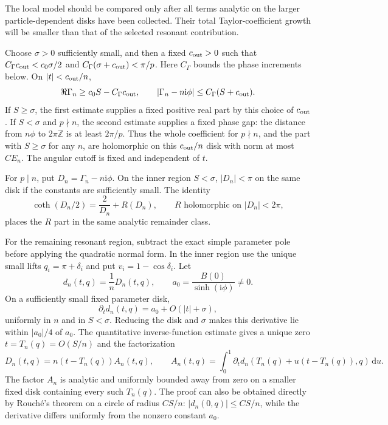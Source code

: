 \documentclass[11pt]{article}
\numberwithin{equation}{section}
\theoremstyle{definition}
\newcommand{\Z}{\mathbb Z}
\newcommand{\dd}{\,\mathrm d}
\newcommand{\ii}{\mathrm i}
\begin{document}
The local model should be compared only after all terms analytic on
the larger particle-dependent disks have been collected. Their total
Taylor-coefficient growth will be smaller than that of the selected
resonant contribution.

Choose $\sigma>0$ sufficiently small, and then a fixed
$c_{\rm out}>0$ such that
$C_\Gamma c_{\rm out}<c_0\sigma/2$ and
$C_\Gamma(\sigma+c_{\rm out})<\pi/p$.
Here $C_\Gamma$ bounds the phase increments below. On
$|t|<c_{\rm out}/n$,
\begin{equation}\label{eq:jets_c_over_n_estimate}
 \Re\Gamma_n\ge c_0S-C_\Gamma c_{\rm out},\qquad
 |\Gamma_n-n\ii\phi|\le C_\Gamma(S+c_{\rm out}).
\end{equation}
If $S\ge\sigma$, the first estimate supplies a fixed positive real
part by this choice of $c_{\rm out}$. If $S<\sigma$ and $p\nmid n$, the
second estimate supplies a fixed phase gap: the distance from
$n\phi$ to $2\pi\Z$ is at least $2\pi/p$. Thus the whole
coefficient for $p\nmid n$, and the part with $S\ge\sigma$ for any
$n$, are holomorphic on this $c_{\rm out}/n$ disk with norm at most $CE_n$.
The angular cutoff is fixed and independent of $t$.

For $p\mid n$, put $D_n=\Gamma_n-n\ii\phi$. On the inner region
$S<\sigma$, $|D_n|<\pi$ on the same disk if the constants are
sufficiently small. The identity
\begin{equation}\label{eq:jets_coth_subtraction}
 \coth(D_n/2)=\frac2{D_n}+R(D_n),
 \qquad R \text{ holomorphic on } |D_n|<2\pi,
\end{equation}
places the $R$ part in the same analytic remainder class.

For the remaining resonant region, subtract the exact simple parameter
pole before applying the quadratic normal form. In the inner region use the unique small
lifts $q_i=\pi+\delta_i$ and put $v_i=1-\cos\delta_i$. Let
\[
 d_n(t,q)=\frac1nD_n(t,q),\qquad
 a_0=\frac{B(0)}{\sinh(\ii\phi)}\ne0.
\]
On a sufficiently small fixed parameter disk,
\[
 \partial_t d_n(t,q)=a_0+O(|t|+\sigma),
\]
uniformly in $n$ and in $S<\sigma$. Reducing the disk and $\sigma$
makes this derivative lie within $|a_0|/4$ of $a_0$. The quantitative
inverse-function estimate gives a unique zero
$t=T_n(q)=O(S/n)$ and the factorization
\begin{equation}\label{eq:jets_exact_pole_factor}
 D_n(t,q)=n(t-T_n(q))A_n(t,q),\qquad
 A_n(t,q)=\int_0^1\partial_t d_n
       (T_n(q)+u(t-T_n(q)),q)\dd u.
\end{equation}
The factor $A_n$ is analytic and uniformly bounded away from zero on
a smaller fixed disk containing every such $T_n(q)$. The proof can
also be obtained directly by Rouch\'e's theorem on a circle of radius
$CS/n$: $|d_n(0,q)|\le CS/n$, while the derivative differs uniformly
from the nonzero constant $a_0$.
\end{document}
